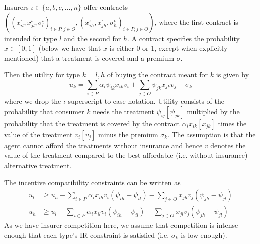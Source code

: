 \documentclass[12pt,english,a4paper]{article}
\begin{document}
Insurers \(\iota \in \{a,b,c,...,n\}\) offer contracts \(((x_{il}^{\iota},x_{jl}^{\iota},\sigma_l^{\iota})_{i \in P, j \in O},(x_{ih}^{\iota},x_{jh}^{\iota},\sigma_h^{\iota})_{i \in P, j \in O})\), where the first contract is intended for type \(l\) and the second for \(h\). A contract specifies the probability \(x \in [0,1]\) (below we have that \(x\) is either 0 or 1, except when explicitly mentioned) that a treatment is covered and a premium \(\sigma\).

Then the utility for type \(k=l,h\) of buying the contract meant for \(k\) is given by
\begin{equation}
\label{eq:11}
u_k = \sum_{i \in P} \alpha_i \psi_{ik} x_{ik} v_i + \sum_{j \in O} \psi_{jk} x_{jk} v_j - \sigma_k
\end{equation}
where we drop the \(\iota\) superscript to ease notation. Utility consists of the probability that consumer \(k\) needs the treatment \(\psi_{ij} [\psi_{jk}]\) multiplied by the probability that the treatment is covered by the contract \(\alpha_i x_{ik} [x_{jk}]\) times the value of the treatment \(v_i [v_j]\) minus the premium \(\sigma_k\).  The assumption is that the agent cannot afford the treatments without insurance and hence \(v\) denotes the value of the treatment compared to the best affordable (i.e. without insurance) alternative treatment.

The incentive compatibility constraints can be written as
\begin{align}
\label{eq:12} \tag{$IC_l$}
u_l &\geq  u_h - \sum_{i \in P} \alpha_i x_{ih} v_i (\psi_{ih}-\psi_{il}) - \sum_{j \in O} x_{jh} v_j (\psi_{jh}-\psi_{jl})  \\
\label{eq:12a} \tag{$IC_h$}
u_h &\geq  u_l + \sum_{i \in P} \alpha_i x_{il} v_i (\psi_{ih}-\psi_{il}) + \sum_{j \in O} x_{jl} v_j (\psi_{jh}-\psi_{jl})
\end{align}
As we have insurer competition here, we assume that competition is intense enough that each type's IR constraint is satisfied (i.e. \(\sigma_k\) is low enough).
\end{document}
